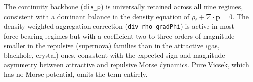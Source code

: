 \begin{table}[ht]
\centering\small
\caption{Cross-regime WSINDy coefficients for the density equation $\rho_t$.
Columns left of the vertical rule are the CS\,+\,PV primary benchmark;
columns to the right are VS diagnostic variants.
A blank cell indicates the term was eliminated by MSTLS\@.}
\label{tab:wsindy_cross_rho}
\end{table}

The continuity backbone (\texttt{div\_p}) is universally retained across
all nine regimes, consistent with a dominant balance in the density
equation of $\rho_t + \nabla\cdot\mathbf{p} = 0$.  The density-weighted
aggregation correction (\texttt{div\_rho\_gradPhi}) is active in most
force-bearing regimes but with a coefficient two to three orders of
magnitude smaller in the repulsive (supernova) families than in the
attractive (gas, blackhole, crystal) ones, consistent with the
expected sign and magnitude asymmetry between attractive and repulsive
Morse dynamics.  Pure Vicsek, which has no Morse potential, omits the
term entirely.


